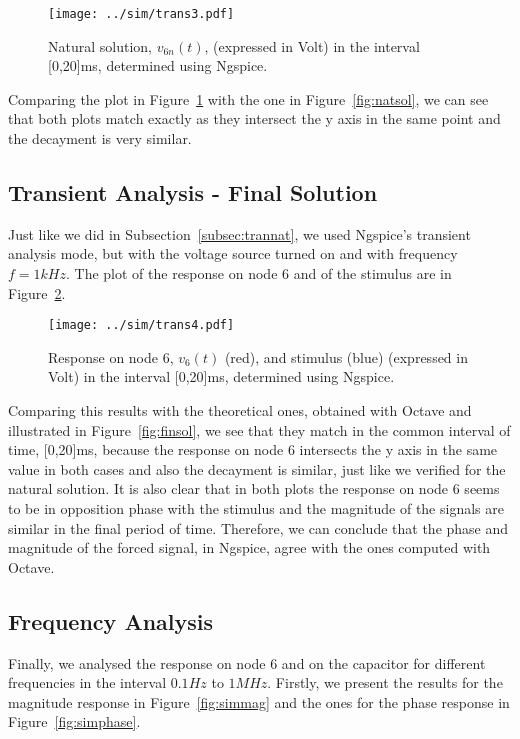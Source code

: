 \begin{figure}[H] \centering
\texttt{[image: ../sim/trans3.pdf]}
\caption{Natural solution, $v_{6n}(t)$, (expressed in Volt) in the interval [0,20]ms, determined using Ngspice.}
\label{fig:trans3}
\end{figure}

Comparing the plot in Figure~\ref{fig:trans3} with the one in Figure~\ref{fig:natsol}, we can see that both plots match exactly as they intersect the y axis in the same point and the decayment is very similar.

\subsection{Transient Analysis - Final Solution} \label{subsec:tranfin}

Just like we did in Subsection~\ref{subsec:trannat}, we used Ngspice's transient analysis mode, but with the voltage source turned on and with frequency $f=1kHz$. The plot of the response on node 6 and of the stimulus are in Figure~\ref{fig:trans4}.

\begin{figure}[H] \centering
\texttt{[image: ../sim/trans4.pdf]}
\caption{Response on node 6, $v_{6}(t)$ (red), and stimulus (blue) (expressed in Volt) in the interval [0,20]ms, determined using Ngspice.}
\label{fig:trans4}
\end{figure}

Comparing this results with the theoretical ones, obtained with Octave and illustrated in Figure~\ref{fig:finsol}, we see that they match in the common interval of time, [0,20]ms, because the response on node 6 intersects the y axis in the same value in both cases and also the decayment is similar, just like we verified for the natural solution. It is also clear that in both plots the response on node 6 seems to be in opposition phase with the stimulus and the magnitude of the signals are similar in the final period of time. Therefore, we can conclude that the phase and magnitude of the forced signal, in Ngspice, agree with the ones computed with Octave.

\subsection{Frequency Analysis} \label{subsec:freqanalysis}

Finally, we analysed the response on node 6 and on the capacitor for different frequencies in the interval $0.1Hz$ to $1MHz$. Firstly, we present the results for the magnitude response in Figure~\ref{fig:simmag} and the ones for the phase response in Figure~\ref{fig:simphase}.

